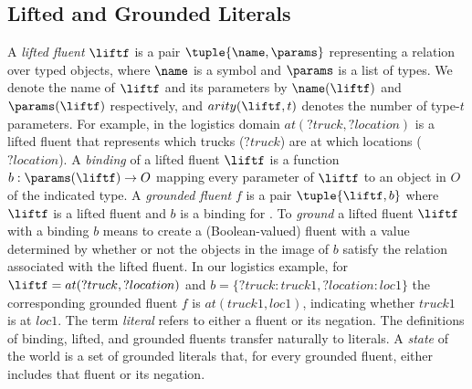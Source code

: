 \subsection{Lifted and Grounded Literals}
A \emph{lifted fluent} $\liftf$ is a pair $\tuple{\name, \params}$ representing a relation over typed objects, where  $\name$ is a symbol and $\params$ is a list of types. 
We denote the name of $\liftf$ and its parameters by $\name(\liftf)$ and $\params(\liftf)$ respectively, and $arity(\liftf,t)$ denotes the number of type-$t$ parameters. 
For example, in the logistics domain $at(?truck, ?location)$ is a lifted fluent that represents which trucks ($?truck$) are at which locations ($?location$). 
A \emph{binding} of a lifted fluent $\liftf$ is a function $b: \params(\liftf)\rightarrow O$ 
mapping every parameter of $\liftf$ to an object in $O$ of the indicated type. 
A \emph{grounded fluent} $f$ is a pair $\tuple{\liftf, b}$ where $\liftf$ is a lifted fluent 
and $b$ is a binding for \liftf. 
To \emph{ground} a lifted fluent $\liftf$ with a binding $b$ means to 
create a (Boolean-valued) fluent with a value determined by whether or not the objects in the image of $b$ satisfy the relation associated with the lifted fluent. 
In our logistics example, for $\liftf=at(?truck, ?location)$ and $b=\{?truck: truck1, ?location: loc1\}$ 
the corresponding grounded fluent $f$ is $at(truck1, loc1)$, indicating whether $truck1$ is at $loc1$.
The term \emph{literal} refers to either a fluent or its negation. 
The definitions of binding, lifted, and grounded fluents transfer naturally to literals. 
A \emph{state} of the world is a set of grounded literals that, for every grounded fluent, either includes that fluent or its negation. 


